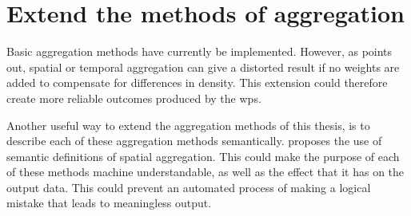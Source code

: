 \section{Extend the methods of aggregation}
\label{par:FRaggregation}

Basic aggregation methods have currently be implemented. However, as \cite{SW:Ganesan} points out, spatial or temporal aggregation can give a distorted result if no weights are added to compensate for differences in density. This extension could therefore create more reliable outcomes produced by the \ac{wps}. 

Another useful way to extend the aggregation methods of this thesis, is to describe each of these aggregation methods semantically. \cite{SSW:Stasch4} proposes the use of semantic definitions of spatial aggregation. This could make the purpose of each of these methods machine understandable, as well as the effect that it has on the output data. This could prevent an automated process of making a logical mistake that leads to meaningless output. 
